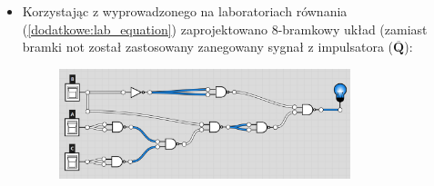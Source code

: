 \begin{itemize}
    \item Korzystając z wyprowadzonego na laboratoriach równania (\ref{dodatkowe:lab_equation}) zaprojektowano 8-bramkowy układ (zamiast bramki not został zastosowany zanegowany sygnał z impulsatora ($\overline{\textbf{Q}}$):
        \begin{figure}[H]
            \centering
            \includegraphics[width=0.8\textwidth]{img/dodatkowe/schemat_lab_w_not.png}
            \caption{}
            \label{dodatkowe:schemat_lab}
        \end{figure}

\pagebreak


\end{itemize}
